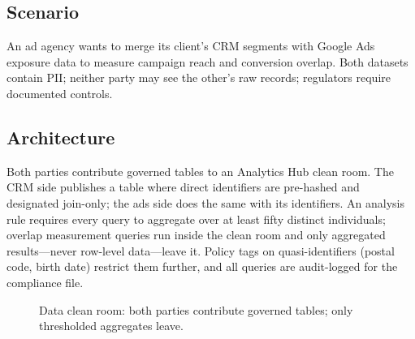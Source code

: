 \subsection{Scenario}
An ad agency wants to merge its client's CRM segments with Google Ads exposure data to measure campaign reach and conversion overlap. Both datasets contain PII; neither party may see the other's raw records; regulators require documented controls.

\subsection{Architecture}
Both parties contribute governed tables to an Analytics Hub clean room. The CRM side publishes a table where direct identifiers are pre-hashed and designated join-only; the ads side does the same with its identifiers. An analysis rule requires every query to aggregate over at least fifty distinct individuals; overlap measurement queries run inside the clean room and only aggregated results---never row-level data---leave it. Policy tags on quasi-identifiers (postal code, birth date) restrict them further, and all queries are audit-logged for the compliance file.

\begin{figure}[H]
    \centering
    \caption{Data clean room: both parties contribute governed tables; only thresholded aggregates leave.}
    \label{fig:ch8-clean-room}
\end{figure}

